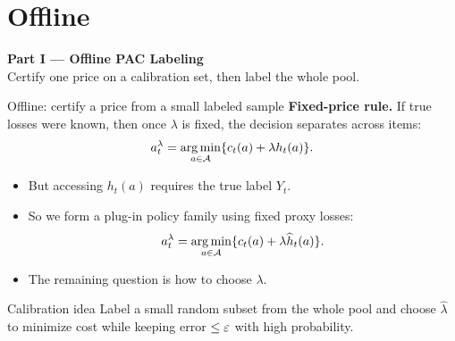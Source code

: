 \section{Offline}
\begin{frame}[plain]
  \centering
  \vfill
  {\Large\bfseries\color{accent} Part I --- Offline PAC Labeling}\\[6pt]
  \normalsize Certify one price on a calibration set, then label the whole pool.
  \vfill
\end{frame}

\begin{frame}{Offline: certify a price from a small labeled sample}
  \small
  \textbf{Fixed-price rule.} If true losses were known, then once
  \(\lambda\) is fixed, the decision separates across items:
  \[
      a_t^\lambda
      =
      \operatorname*{arg\,min}_{a\in\mathcal{A}}
      \{c_t(a)+\lambda h_t(a)\}.
  \]
  \begin{itemize}
    \item But accessing \(h_t(a)\) requires the true label \(Y_t\).
    \item So we form a plug-in policy family using fixed proxy losses:
      \[
          a_t^\lambda
          =
          \operatorname*{arg\,min}_{a\in\mathcal{A}}
          \{c_t(a)+\lambda \widehat h_t(a)\}.
      \]
    \item The remaining question is how to choose \(\lambda\).
  \end{itemize}
  \begin{block}{Calibration idea}
    Label a small random subset from the whole pool and choose
    \(\hat\lambda\) to minimize cost while keeping error \(\le\varepsilon\) with high
    probability.
  \end{block}
\end{frame}

